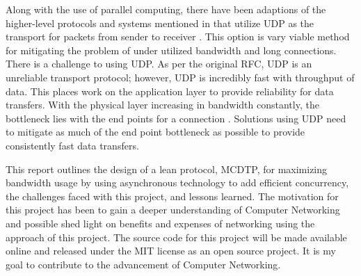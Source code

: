 Along with the use of parallel computing, there have been adaptions of the higher-level protocols and systems mentioned in \cite{Fan2010} that utilize UDP as the transport for packets from sender to receiver \cite{He2002}\cite{Aspera2016}\cite{Fan2010}\cite{Meiss2007}\cite{gu2007udt}. This option is vary viable method for mitigating the problem of under utilized bandwidth and long connections. There is a challenge to using UDP. As per the original RFC, UDP is an unreliable transport protocol; however, UDP is incredibly fast with throughput of data. This places work on the application layer to provide reliability for data transfers. With the physical layer increasing in bandwidth constantly, the bottleneck lies with the end points for a connection \cite{Aspera2016}\cite{Fan2010}. Solutions using UDP need to mitigate as much of the end point bottleneck as possible to provide consistently fast data transfers.

This report outlines the design of a lean protocol, MCDTP, for maximizing bandwidth usage by using asynchronous technology to add efficient concurrency, the challenges faced with this project, and lessons learned. The motivation for this project has been to gain a deeper understanding of Computer Networking and possible shed light on benefits and expenses of networking using the approach of this project. The source code for this project will be made available online and released under the MIT license as an open source project. It is my goal to contribute to the advancement of Computer Networking.
